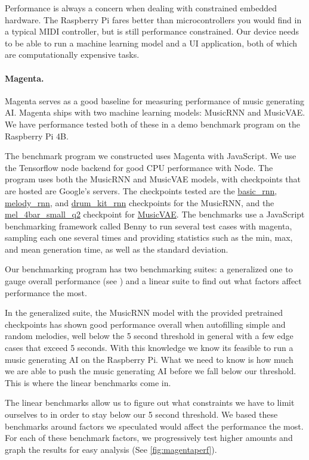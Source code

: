 Performance is always a concern when dealing with constrained embedded hardware. The
Raspberry Pi fares better than microcontrollers you would find in a typical MIDI
controller, but is still performance constrained. Our device needs to be able to run a
machine learning model and a UI application, both of which are computationally expensive
tasks.

\paragraph{Magenta.}

Magenta serves as a good baseline for measuring performance of music generating AI.
Magenta ships with two machine learning models: MusicRNN and MusicVAE. We have performance
tested both of these in a demo benchmark program on the Raspberry Pi 4B.

The benchmark program we constructed uses Magenta with JavaScript. We use the Tensorflow
node backend for good CPU performance with Node. The program uses both the MusicRNN and
MusicVAE models, with checkpoints that are hosted are Google's servers. The checkpoints
tested are the \url{basic_rnn}, \url{melody_rnn}, and \url{drum_kit_rnn} checkpoints for
the MusicRNN, and the \url{mel_4bar_small_q2} checkpoint for \url{MusicVAE}. The benchmarks
use a JavaScript benchmarking framework called Benny to run several test cases with
magenta, sampling each one several times and providing statistics such as the min, max,
and mean generation time, as well as the standard deviation.

Our benchmarking program has two benchmarking suites: a generalized one to gauge overall
performance (see ) and a linear suite to find out what
factors affect performance the most.

In the generalized suite, the MusicRNN model with the provided pretrained checkpoints has
shown good performance overall when autofilling simple and random melodies, well below the
5 second threshold in general with a few edge cases that exceed 5 seconds. With this
knowledge we know its feasible to run a music generating AI on the Raspberry Pi. What we
need to know is how much we are able to push the music generating AI before we fall below
our threshold. This is where the linear benchmarks come in.

The linear benchmarks allow us to figure out what constraints we have to limit ourselves
to in order to stay below our 5 second threshold. We based these benchmarks around factors
we speculated would affect the performance the most. For each of these benchmark factors,
we progressively test higher amounts and graph the results for easy analysis (See
\autoref{fig:magentaperf}).

